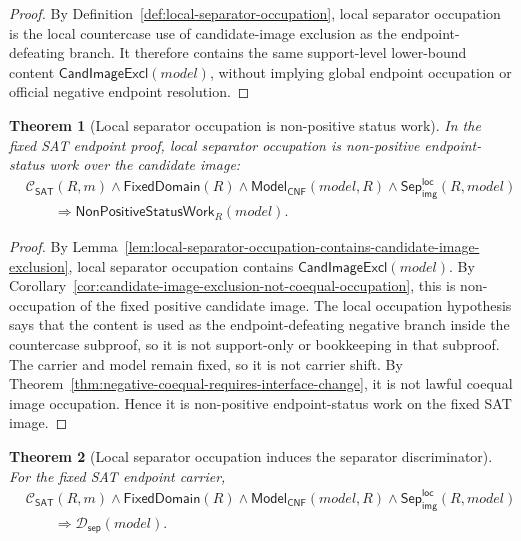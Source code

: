 \documentclass[11pt]{article}
\newtheorem{theorem}{Theorem}[section]
\theoremstyle{definition}
\theoremstyle{remark}
\newcommand{\LocalSepImgOcc}{\mathsf{Sep}_{\mathsf{img}}^{\mathsf{loc}}}
\newcommand{\ClayCtx}{\mathcal{C}_{\mathsf{SAT}}(R,m)}
\newcommand{\FixedDom}{\mathsf{FixedDomain}}
\newcommand{\SepDisc}{\mathcal{D}_{\mathsf{sep}}}
\newcommand{\ModelOfCnf}{\mathsf{Model}_{\mathsf{CNF}}}
\newcommand{\CandImageExcl}{\mathsf{CandImageExcl}}
\newcommand{\NonPositiveStatusWork}{\mathsf{NonPositiveStatusWork}}
\begin{document}
\begin{proof}
By Definition~\ref{def:local-separator-occupation}, local separator occupation is the local countercase use of candidate-image exclusion as the endpoint-defeating branch. It therefore contains the same support-level lower-bound content \(\CandImageExcl(model)\), without implying global endpoint occupation or official negative endpoint resolution.
\end{proof}

\begin{theorem}[Local separator occupation is non-positive status work]
\label{thm:local-sepocc-is-non-positive-status-work}
In the fixed SAT endpoint proof, local separator occupation is non-positive endpoint-status work over the candidate image:
\[
\begin{aligned}
  &\ClayCtx\wedge\FixedDom(R)\wedge\ModelOfCnf(model,R)\wedge\LocalSepImgOcc(R,model)\\
  &\qquad\Rightarrow \NonPositiveStatusWork_R(model).
\end{aligned}
\]
\end{theorem}

\begin{proof}
By Lemma~\ref{lem:local-separator-occupation-contains-candidate-image-exclusion}, local separator occupation contains \(\CandImageExcl(model)\). By Corollary~\ref{cor:candidate-image-exclusion-not-coequal-occupation}, this is non-occupation of the fixed positive candidate image. The local occupation hypothesis says that the content is used as the endpoint-defeating negative branch inside the countercase subproof, so it is not support-only or bookkeeping in that subproof. The carrier and model remain fixed, so it is not carrier shift. By Theorem~\ref{thm:negative-coequal-requires-interface-change}, it is not lawful coequal image occupation. Hence it is non-positive endpoint-status work on the fixed SAT image.
\end{proof}

\begin{theorem}[Local separator occupation induces the separator discriminator]
\label{thm:local-sepocc-induces-sepdisc}
For the fixed SAT endpoint carrier,
\[
\begin{aligned}
  &\ClayCtx\wedge\FixedDom(R)\wedge\ModelOfCnf(model,R)\wedge\LocalSepImgOcc(R,model)\\
  &\qquad\Rightarrow \SepDisc(model).
\end{aligned}
\]
\end{theorem}
\end{document}
